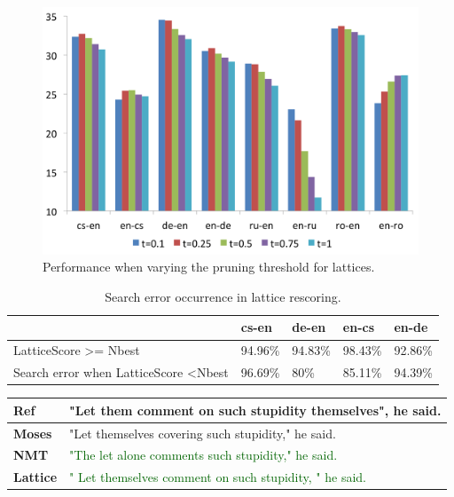 \documentclass[landscape]{jhuslides3C}
\begin{document}
\begin{figure}
\begin{center}
\includegraphics[scale=0.7]{images/thresholds.png}
\caption{Performance when varying the pruning threshold for lattices.}
\end{center}
\end{figure}

\vspace{60mm}
\begin{table}
\centering
\begin{tabular}{|l|l|l|l|l|}
\hline
                                               & cs-en   & de-en   & en-cs   & en-de   \\ \hline
LatticeScore \textgreater= Nbest               & 94.96\% & 94.83\% & 98.43\% & 92.86\% \\ \hline
Search error when LatticeScore \textless Nbest & 96.69\% & 80\%    & 85.11\% & 94.39\% \\ \hline
\end{tabular}
\caption{Search error occurrence in lattice rescoring.}
\end{table}

\vspace{10mm}
\begin{center}
\begin{tabular}{|p{3cm}|p{20cm}|}
\textbf{Ref} & "Let them comment on such stupidity themselves", he said.\\[1cm] \hline \hline
\textbf{Moses} & \textcolor{verydarkorange}{"Let themselves covering such stupidity," he said.} \\[1cm] \hline \hline
\textbf{NMT} & \textcolor{darkgreen}{"The let alone comments such stupidity," he said.}\\[1cm] \hline \hline
\textbf{Lattice} & \textcolor{darkgreen}{" Let themselves comment on such stupidity, " he said.}
\end{tabular}
\end{center}
\end{document}
